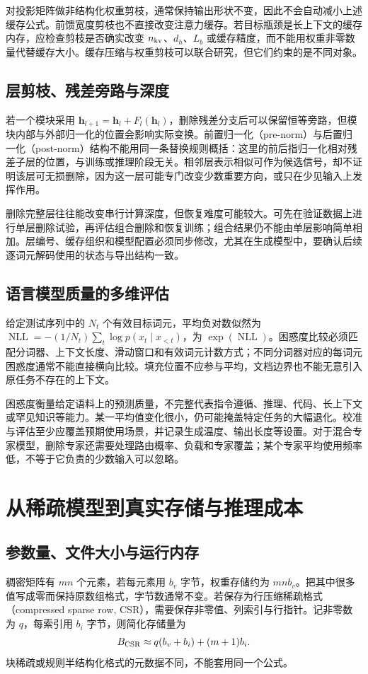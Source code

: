 \documentclass[UTF8,12pt,a4paper,fontset=fandol]{ctexart}
\begin{document}
对投影矩阵做非结构化权重剪枝，通常保持输出形状不变，因此不会自动减小上述缓存公式。前馈宽度剪枝也不直接改变注意力缓存。若目标瓶颈是长上下文的缓存内存，应检查剪枝是否确实改变 $n_{\rm kv}$、$d_h$、$L_b$ 或缓存精度，而不能用权重非零数量代替缓存大小。缓存压缩与权重剪枝可以联合研究，但它们约束的是不同对象。

\subsection{层剪枝、残差旁路与深度}
若一个模块采用 $\mathbf h_{l+1}=\mathbf h_l+F_l(\mathbf h_l)$，删除残差分支后可以保留恒等旁路，但模块内部与外部归一化的位置会影响实际变换。前置归一化（pre-norm）与后置归一化（post-norm）结构不能用同一条替换规则概括：这里的前后指归一化相对残差子层的位置，与训练或推理阶段无关。相邻层表示相似可作为候选信号，却不证明该层可无损删除，因为这一层可能专门改变少数重要方向，或只在少见输入上发挥作用。

删除完整层往往能改变串行计算深度，但恢复难度可能较大。可先在验证数据上进行单层删除试验，再评估组合删除和恢复训练；组合结果仍不能由单层影响简单相加。层编号、缓存组织和模型配置必须同步修改，尤其在生成模型中，要确认后续逐词元解码使用的状态与导出结构一致。

\subsection{语言模型质量的多维评估}
给定测试序列中的 $N_t$ 个有效目标词元，平均负对数似然为 $\operatorname{NLL}=-(1/N_t)\sum_t\log p(x_t\mid x_{<t})$，为 $\exp(\operatorname{NLL})$。困惑度比较必须匹配分词器、上下文长度、滑动窗口和有效词元计数方式；不同分词器对应的每词元困惑度通常不能直接横向比较。填充位置不应参与平均，文档边界也不能无意引入原任务不存在的上下文。

困惑度衡量给定语料上的预测质量，不完整代表指令遵循、推理、代码、长上下文或罕见知识等能力。某一平均值变化很小，仍可能掩盖特定任务的大幅退化。校准与评估至少应覆盖预期使用场景，并记录生成温度、输出长度等设置。对于混合专家模型，删除专家还需要处理路由概率、负载和专家覆盖；某个专家平均使用频率低，不等于它负责的少数输入可以忽略。

\section{从稀疏模型到真实存储与推理成本}
\label{sec:prune-systems}

\subsection{参数量、文件大小与运行内存}
稠密矩阵有 $mn$ 个元素，若每元素用 $b_v$ 字节，权重存储约为 $mnb_v$。把其中很多值写成零而保持原数组格式，字节数通常不变。若保存为行压缩稀疏格式（compressed sparse row, CSR），需要保存非零值、列索引与行指针。记非零数为 $q$，每索引用 $b_i$ 字节，则简化存储量为
\begin{equation}
 B_{\rm CSR}\approx q(b_v+b_i)+(m+1)b_i.
 \label{eq:prune-csr}
\end{equation}
块稀疏或规则半结构化格式的元数据不同，不能套用同一个公式。
\end{document}
